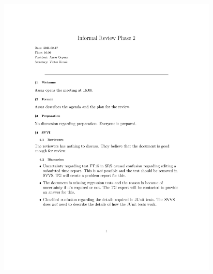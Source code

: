 \documentclass{article}
\begin{document}
 
 \begin{figure}
     \centering
     \includegraphics[width=13cm]{images/Phase2_2021_02_17-1}
     \renewcommand\figurename{Figure}
     \label{fig:my_label}
 \end{figure}
 
\end{document}
